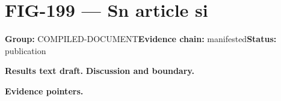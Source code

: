 \clearpage
\section{FIG-199 --- Sn article si}
\label{figpage:fig-199}
\textbf{Group:} COMPILED-DOCUMENT\quad \textbf{Evidence chain:} manifested\quad \textbf{Status:} publication

\textbf{Results text draft.} 
\textbf{Discussion and boundary.} 


\textbf{Evidence pointers.}



\vfill
